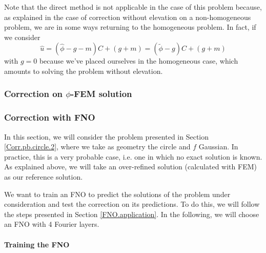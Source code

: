 \begin{Rem}
	Note that the direct method is not applicable in the case of this problem because, as explained in the case of correction without elevation on a non-homogeneous problem, we are in some ways returning to the homogeneous problem. In fact, if we consider 
	\begin{equation*}
		\hat{u}=(\hat{\phi}-g-m)C+(g+m)=(\tilde{\phi}-g)C+(g+m)
	\end{equation*}
	with $g=0$ because we've placed ourselves in the homogeneous case, which amounts to solving the problem without elevation.
\end{Rem}

\subsubsection{Correction on $\phi$-FEM solution} \label{Corr.results.phifem}


\subsubsection{Correction with FNO} \label{Corr.results.FNO}

In this section, we will consider the problem presented in Section \ref{Corr.pb.circle.2}, where we take as geometry the circle and $f$ Gaussian. In practice, this is a very probable case, i.e. one in which no exact solution is known. As explained above, we will take an over-refined solution (calculated with FEM) as our reference solution. 

We want to train an FNO to predict the solutions of the problem under consideration and test the correction on its predictions. To do this, we will follow the steps presented in Section \ref{FNO.application}. In the following, we will choose an FNO with 4 Fourier layers.

\paragraph{Training the FNO} \label{Corr.results.FNO.Training}

